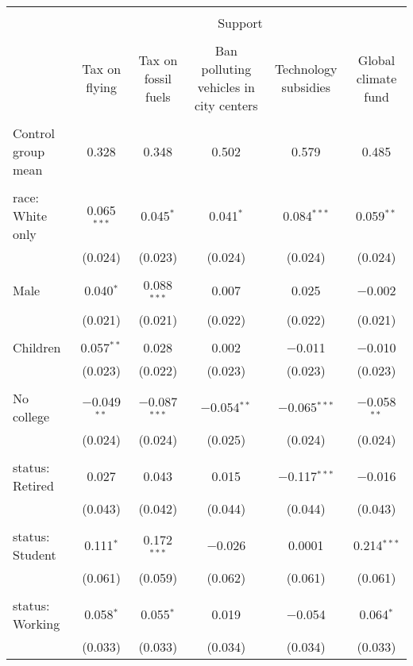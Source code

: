 
\begin{tabular}{@{\extracolsep{5pt}}lccccc} 
\\[-1.8ex]\hline 
\hline \\[-1.8ex] 
 & \multicolumn{5}{c}{Support} \\ 
\cline{2-6} 
\\[-1.8ex] & Tax on flying & Tax on fossil fuels & Ban polluting vehicles in city centers & Technology subsidies & Global climate fund \\ 
\hline \\[-1.8ex] 
 Control group mean & 0.328 & 0.348 & 0.502 & 0.579 & 0.485  \\ \hline \\[-1.8ex] race: White only & 0.065$^{***}$ & 0.045$^{*}$ & 0.041$^{*}$ & 0.084$^{***}$ & 0.059$^{**}$ \\ 
  & (0.024) & (0.023) & (0.024) & (0.024) & (0.024) \\ 
  & & & & & \\ 
 Male & 0.040$^{*}$ & 0.088$^{***}$ & 0.007 & 0.025 & $-$0.002 \\ 
  & (0.021) & (0.021) & (0.022) & (0.022) & (0.021) \\ 
  & & & & & \\ 
 Children & 0.057$^{**}$ & 0.028 & 0.002 & $-$0.011 & $-$0.010 \\ 
  & (0.023) & (0.022) & (0.023) & (0.023) & (0.023) \\ 
  & & & & & \\ 
 No college & $-$0.049$^{**}$ & $-$0.087$^{***}$ & $-$0.054$^{**}$ & $-$0.065$^{***}$ & $-$0.058$^{**}$ \\ 
  & (0.024) & (0.024) & (0.025) & (0.024) & (0.024) \\ 
  & & & & & \\ 
 status: Retired & 0.027 & 0.043 & 0.015 & $-$0.117$^{***}$ & $-$0.016 \\ 
  & (0.043) & (0.042) & (0.044) & (0.044) & (0.043) \\ 
  & & & & & \\ 
 status: Student & 0.111$^{*}$ & 0.172$^{***}$ & $-$0.026 & 0.0001 & 0.214$^{***}$ \\ 
  & (0.061) & (0.059) & (0.062) & (0.061) & (0.061) \\ 
  & & & & & \\ 
 status: Working & 0.058$^{*}$ & 0.055$^{*}$ & 0.019 & $-$0.054 & 0.064$^{*}$ \\ 
  & (0.033) & (0.033) & (0.034) & (0.034) & (0.033) \\ 

\end{tabular}
